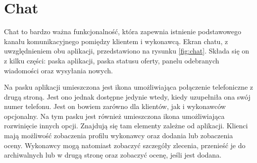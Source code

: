 \section{Chat}

Chat to bardzo ważna funkcjonalność, która zapewnia istnienie podstawowego kanału komunikacyjnego pomiędzy klientem i wykonawcą. Ekran chatu, z uwzględnieniem obu aplikacji, przedstawiono na rysunku \ref{fig:chat}. Składa się on z kilku części: paska aplikacji, paska statusu oferty, panelu odebranych wiadomości oraz wysyłania nowych.

Na pasku aplikacji umieszczona jest ikona umożliwiająca połączenie telefoniczne z drugą stroną. Jest ono jednak dostępne jedynie wtedy, kiedy uzupełniła ona swój numer telefonu. Jest on bowiem zarówno dla klientów, jak i wykonawców opcjonalny. Na tym pasku jest również umieszczona ikona umożliwiająca rozwinięcie innych opcji. Znajdują się tam elementy zależne od aplikacji. Klienci mają możliwość zobaczenia profilu wykonawcy oraz dodania lub zobaczenia oceny. Wykonawcy mogą natomiast zobaczyć szczegóły zlecenia, przenieść je do archiwalnych lub w drugą stronę oraz zobaczyć ocenę, jeśli jest dodana.


